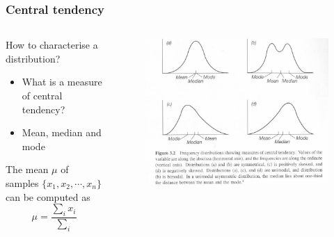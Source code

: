 \documentclass[10pt, compress]{beamer}
\begin{document}
\begin{frame}
    \frametitle{Central tendency}
    \begin{columns}
        \begin{block}{How to characterise a distribution?}
            \begin{itemize}
                \item \alert{What is a measure of central tendency?}
                \item Mean, median and mode
            \end{itemize}
            \smallskip
            The mean $\mu$ of samples $\{x_1,x_2,\cdots,x_n\}$ can be computed
            as
            \begin{equation}
                \mu = \frac{\sum_i x_i}{\sum_i}
            \end{equation}
        \end{block}
        \begin{block}{}
            \begin{figure}
                \begin{center}
                    \includegraphics[scale=0.5]{img/central_tendancy.jpg}
                \end{center}
            \end{figure}
        \end{block}
    \end{columns}
\end{frame}
\end{document}
